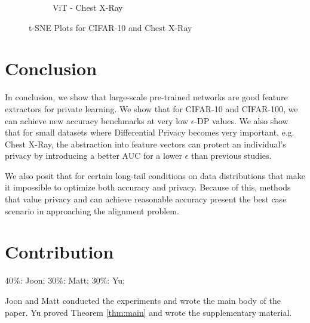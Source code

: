 \documentclass{article}
\theoremstyle{definition}
\begin{document}
\begin{figure}[h!]
\begin{subfigure}{.48\textwidth}
        \caption{ViT - Chest X-Ray}
    \end{subfigure}
    \caption{t-SNE Plots for CIFAR-10 and Chest X-Ray}
    \label{fig:tsne}
\end{figure}

\section{Conclusion}

In conclusion, we show that large-scale pre-trained networks are good feature extractors for private learning. We show that for CIFAR-10 and CIFAR-100, we can achieve new accuracy benchmarks at very low $\epsilon$-DP values. We also show that for small datasets where Differential Privacy becomes very important, e.g. Chest X-Ray, the abstraction into feature vectors can protect an individual's privacy by introducing a better AUC for a lower $\epsilon$ than previous studies.

We also posit that for certain long-tail conditions on data distributions that make it impossible to optimize both accuracy and privacy. Because of this, methods that value privacy and can achieve reasonable accuracy present the best case scenario in approaching the alignment problem.

\section{Contribution}
$40\%$: Joon; $30\%$: Matt; $30\%$: Yu;


Joon and Matt conducted the experiments and wrote the main body of the paper. Yu proved Theorem \ref{thm:main} and wrote the supplementary material.


\end{document}
